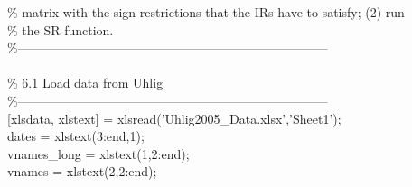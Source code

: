 \hspace{1mm}\hspace{5mm} \hspace{5mm} \textcolor{matlabgreen}{\% matrix with the sign restrictions that the IRs have to satisfy; (2) run  }\\ 
\hspace{1mm}\hspace{5mm} \hspace{5mm} \textcolor{matlabgreen}{\% the SR function.  }\\ 
\hspace{1mm}\hspace{5mm} \hspace{5mm} \textcolor{matlabgreen}{\%--------------------------------------------------------------------------  }\\ 
\hspace{1mm}\hspace{5mm} \hspace{5mm}  \\ 
\hspace{1mm}\hspace{5mm} \hspace{5mm} \textcolor{matlabgreen}{\% 6.1 Load data from Uhlig }\\ 
\hspace{1mm}\hspace{5mm} \hspace{5mm} \textcolor{matlabgreen}{\%--------------------------------------------------------------------------  }\\ 
\hspace{1mm}\hspace{5mm} \hspace{5mm} [xlsdata, xlstext] = xlsread(\textcolor{matlabpurple}{'Uhlig2005\_Data.xlsx'},\textcolor{matlabpurple}{'Sheet1'}); \\ 
\hspace{1mm}\hspace{5mm} \hspace{5mm} dates = xlstext(3:end,1); \\ 
\hspace{1mm}\hspace{5mm} \hspace{5mm} vnames\_long = xlstext(1,2:end); \\ 
\hspace{1mm}\hspace{5mm} \hspace{5mm} vnames = xlstext(2,2:end); \\ 
